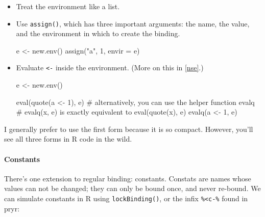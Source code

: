 \documentclass[oneside]{book}
\newenvironment{Shaded}{}{}
\newcommand{\KeywordTok} [1]{\textcolor[rgb]{0.00,0.44,0.13}{{#1}}}
\newcommand{\DataTypeTok}[1]{\textcolor[rgb]{0.56,0.13,0.00}{{#1}}}
\newcommand{\DecValTok}  [1]{\textcolor[rgb]{0.25,0.63,0.44}{{#1}}}
\newcommand{\StringTok}  [1]{\textcolor[rgb]{0.25,0.44,0.63}{{#1}}}
\newcommand{\CommentTok} [1]{\textcolor[rgb]{0.38,0.63,0.69}{{#1}}}
\newcommand{\NormalTok}  [1]{{#1}}
\renewcommand{\hyperref}[2][???]{\autoref{#1}}
\begin{document}
\begin{itemize}
\item
  Treat the environment like a list.

\begin{Shaded}
\end{Shaded}
\item
  Use \texttt{assign()}, which has three important arguments: the name,
  the value, and the environment in which to create the binding.

\begin{Shaded}
\begin{Highlighting}[]
\NormalTok{e <-}\StringTok{ }\KeywordTok{new.env}\NormalTok{()}
\KeywordTok{assign}\NormalTok{(}\StringTok{"a"}\NormalTok{, }\DecValTok{1}\NormalTok{, }\DataTypeTok{envir =} \NormalTok{e)}
\end{Highlighting}
\end{Shaded}
\item
  Evaluate \texttt{\textless{}-} inside the environment. (More on this
  in \hyperref[nse]{evaluation}.)

\begin{Shaded}
\begin{Highlighting}[]
\NormalTok{e <-}\StringTok{ }\KeywordTok{new.env}\NormalTok{()}

\KeywordTok{eval}\NormalTok{(}\KeywordTok{quote}\NormalTok{(a <-}\StringTok{ }\DecValTok{1}\NormalTok{), e)}
\CommentTok{# alternatively, you can use the helper function evalq}
\CommentTok{# evalq(x, e) is exactly equivalent to eval(quote(x), e)}
\KeywordTok{evalq}\NormalTok{(a <-}\StringTok{ }\DecValTok{1}\NormalTok{, e)}
\end{Highlighting}
\end{Shaded}
\end{itemize}

I generally prefer to use the first form because it is so compact.
However, you'll see all three forms in R code in the wild.

\paragraph{Constants}\label{constants}

There's one extension to regular binding: constants. Constats are names
whose values can not be changed; they can only be bound once, and never
re-bound. We can simulate constants in R using \texttt{lockBinding()},
or the infix \texttt{\%\textless{}c-\%} found in pryr:
\end{document}
